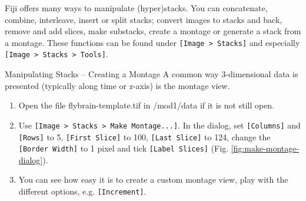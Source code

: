 Fiji offers many ways to manipulate (hyper)stacks. You can concatenate, combine, interleave, insert or split stacks; convert images to stacks and back, remove and add slices, make substacks, create a montage or generate a stack from a montage. These functions can be found under \texttt{[Image > Stacks]} and especially \texttt{[Image > Stacks > Tools]}. 

\begin{taskbox}{Manipulating Stacks -- Creating a Montage}
A common way 3-dimensional data is presented (typically along time or z-axis) is the montage view.

\begin{enumerate}
	\item Open the file flybrain-template.tif in /mod1/data if it is not still open.
	\item Use \texttt{[Image > Stacks > Make Montage...]}. In the dialog, set \texttt{[Columns]} and \texttt{[Rows]} to 5, \texttt{[First Slice]} to 100, \texttt{[Last Slice]} to 124, change the \texttt{[Border Width]} to 1 pixel and tick \texttt{[Label Slices]} (Fig. \ref{fig:make-montage-dialog}).
	
	\begin{minipage}[t]{\linewidth}
		\begin{center}
		\medskip
		\label{fig:make-montage-dialog}
		\end{center}
	\end{minipage}
	
	\item You can see how easy it is to create a custom montage view, play with the different options, e.g. \texttt{[Increment]}.
\end{enumerate}

\end{taskbox}

